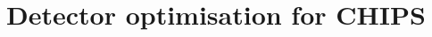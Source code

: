 \chapter{Detector optimisation for CHIPS}
\label{chap:optimisation}

\begin{comment}
You have all of these possible parameters that can affect the performance (event categorisation and kinematic reconstruction) of your WC detector

Positioning of the detector (L, angle off-axis, overburden) *
Size of the detector (height and radius) *
Water quality (attenuation length, scattering vs absorption) *
Which PMT’s you use (time resolution, charge collection) *
How the PMT’s are positioned (percentage coverage, zones)
Calibration quality (position, time, charge)
Reconstruction methodology (likelihood vs CNN)
Given these restrictions

Only certain mine pits usable (fixes L and angle off-axis, use all overburden available)
12.5m radius for practical construction (fixes radius, but not height)
Want to be able to carry the planes easily (Adds limits to PMT coverage percentage)
Will just be looking at beam events, should not need much in the back
PMT’s available. Due to cost etc… we fix the PMT’s we use, can still explore this space with varying the time/charge.
Can look at

Detector height *
Water Quality *
How the PMT’s are positioned (can fix percentage coverage due to practical plane restriction)
Calibration Quality (network ensamble)
Reconstruction Methodology
Generation Parameters

Input beam flux (Use the ones I now have from Anna)
Oscillated beam flux (Use the one I now have)
Cross section splines (Use the ones I have always had, they should be good)
Generation energy range (0-15GeV, this definitely covers the full range of energies)
Fraction of H and O in water (Just keep the 95%
Type of events to generate (Decide on the categories)
Simulation Parameters

Physics List (Negligable changes, therefore, use QGSP_BIC_HP as preferred for energies below 5 GeV)
PMT QE Option (Negligible changes, therefore, use stacking-only )
Absorption Length Scaling (Something to study, need default)
Reflectivity of glass cathode (0.24)
Rayleigh scattering length Scaling (Something to study, need default)
Blacksheet reflectivity Scaling (0.7)
Mie scattering length Scaling (0.0, it’s not important as Maciej found out)
Geometry definition (Something to study, need default)
PMT definition (Think they are pretty good already, use them)
Light Cone definition (Think this is pretty good already use it)
Fiducial generation distance (Set to 1m, higher density in middle and can explore edge)
PMT digitisation simulation (Decide with Paul, just use hits for now!!!)
PMT angular collection efficiency (Keep it as the one Paul suggested, mainly 100%

TODO: Write the story of the optimisation chapter

TODO: Write the optimisation chapter section outline

TODO: Add all the sections below
\end{comment}